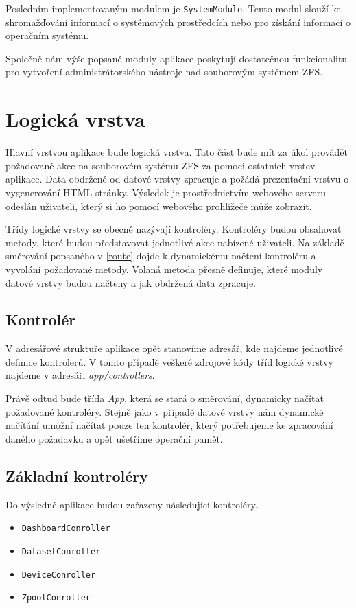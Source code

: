     Posledním implementovaným modulem je \verb|SystemModule|. Tento modul slouží ke shromažďování informací o systémových prostředcích nebo pro získání informací o operačním systému.

    Společně nám výše popsané moduly aplikace poskytují dostatečnou funkcionalitu pro vytvoření administrátorského nástroje nad souborovým systémem ZFS.
\section{Logická vrstva}
Hlavní vrstvou aplikace bude logická vrstva. Tato část bude mít za úkol provádět požadované akce na souborovém systému ZFS za pomoci ostatních vrstev aplikace. Data obdržené od datové vrstvy zpracuje a požádá prezentační vrstvu o vygenerování HTML stránky. Výsledek je prostřednictvím webového serveru odeslán uživateli, který si ho pomocí webového prohlížeče může zobrazit.

Třídy logické vrstvy se obecně nazývají kontroléry. Kontroléry budou obsahovat metody, které budou představovat jednotlivé akce nabízené uživateli. Na základě směrování popsaného v \ref{route} dojde k dynamickému načtení kontroléru a vyvolání požadované metody. Volaná metoda přesně definuje, které moduly datové vrstvy budou načteny a jak obdržená data zpracuje.
    \subsection{Kontrolér}
    V adresářové struktuře aplikace opět stanovíme adresář, kde najdeme jednotlivé definice kontrolerů. V tomto případě veškeré zdrojové kódy tříd logické vrstvy najdeme v adresáři \emph{app/controllers}.

    Právě odtud bude třída \emph{App}, která se stará o směrování, dynamicky načítat požadované kontroléry. Stejně jako v případě datové vrstvy nám dynamické načítání umožní načítat pouze ten kontrolér, který potřebujeme ke zpracování daného požadavku a opět ušetříme operační paměť.

    \subsection{Základní kontroléry}
    Do výsledné aplikace budou zařazeny následující kontroléry.
    \begin{itemize}
      \item \verb|DashboardConroller|
      \item \verb|DatasetConroller|
      \item \verb|DeviceConroller|
      \item \verb|ZpoolConroller|
    \end{itemize}

